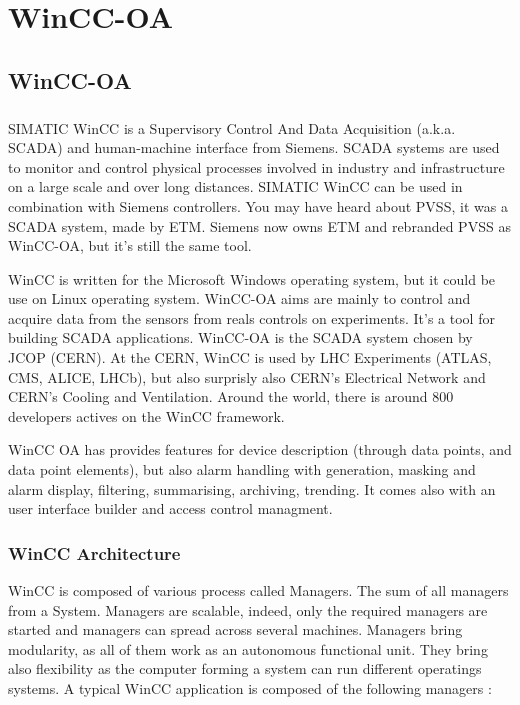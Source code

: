 \documentclass[../main.tex]{subfiles}
\begin{document}
\chapter{WinCC-OA}

\section{WinCC-OA}
\paragraph{}
SIMATIC WinCC is a Supervisory Control And Data Acquisition (a.k.a. SCADA) and human-machine interface from Siemens.
SCADA systems are used to monitor and control physical processes involved in industry and infrastructure on a large scale and over long distances. SIMATIC WinCC can be used in combination with Siemens controllers.
You may have heard about PVSS, it was a SCADA system, made by ETM. 
Siemens now owns ETM and rebranded PVSS as WinCC-OA, but it's still the same tool. 
\par \noindent \newline
WinCC is written for the Microsoft Windows operating system, but it could be use on Linux operating system. 
WinCC-OA aims are mainly to control and acquire data from the sensors from reals controls on experiments.
It's a tool for building SCADA applications. WinCC-OA is the SCADA system chosen by JCOP (CERN).
At the CERN, WinCC is used by LHC Experiments (ATLAS, CMS, ALICE, LHCb), but also surprisly also CERN’s Electrical Network and CERN’s Cooling and Ventilation. Around the world, there is around 800 developers actives on the WinCC framework.
\par \noindent \newline
WinCC OA has provides features for device description (through data points, and data point elements), but also alarm handling with generation, masking and alarm display, filtering, summarising, archiving, trending.
It comes also with an user interface builder and access control managment.

\subsection{WinCC Architecture}
WinCC is composed of various process called Managers. The sum of all managers from a System.
Managers are scalable, indeed, only the required managers are started and managers can spread across several machines. Managers bring modularity, as all of them work as an autonomous functional unit. They bring also flexibility as the computer forming a system can run different operatings systems.
A typical WinCC application is composed of the following managers :
\end{document}
